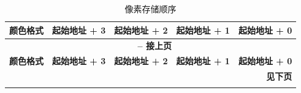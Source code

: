 \documentclass[main\_\_CN.tex]{subfiles}
\begin{document}
\begin{longtable}[c]{ |p{2.5cm}|p{2.5cm}|p{2.5cm}|p{2.5cm}|p{2.5cm}| }
    \caption{像素存储顺序}
    \label{tab:color-space-endian}\\\hline

    \rowcolor{lightgray}
    \textbf{颜色格式} & \textbf{起始地址 + 3} & \textbf{起始地址 + 2} & \textbf{起始地址 + 1} & \textbf{起始地址 + 0} \\\hline
    \endfirsthead


    \multicolumn{5}{c}{\bfseries \tablename\ \thetable{} -- 接上页}\\\hline
    \rowcolor{lightgray}
    \textbf{颜色格式} & \textbf{起始地址 + 3} & \textbf{起始地址 + 2} & \textbf{起始地址 + 1} & \textbf{起始地址 + 0} \\\hline
    \endhead

    \multicolumn{5}{r}{\textbf{见下页}} \\
    \endfoot

    \endlastfoot


\end{longtable}
\end{document}
